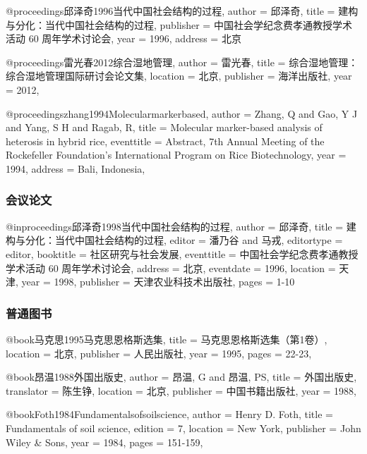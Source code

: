 \begin{latexexample}
  @proceedings{邱泽奇1996当代中国社会结构的过程,  
    author       = {邱泽奇},
    title        = {建构与分化：当代中国社会结构的过程},
    publisher    = {中国社会学纪念费孝通教授学术活动 60 周年学术讨论会},
    year         = {1996},
    address      = {北京}
  }

  @proceedings{雷光春2012综合湿地管理,
    author          = {雷光春},
    title           = {综合湿地管理：综合湿地管理国际研讨会论文集},
    location        = {北京},
    publisher       = {海洋出版社},
    year            = {2012},
  }

  @proceedings{zhang1994Molecularmarkerbased,  
    author       = {Zhang, Q and Gao, Y J and Yang, S H and Ragab, R},
    title        = {Molecular marker-based analysis of heterosis in hybrid rice},
    eventtitle   = {Abstract, 7th Annual Meeting of the Rockefeller Foundation's International Program on Rice Biotechnology},
    year         = {1994},
    address      = {Bali, Indonesia},
  }
\end{latexexample}


\subsubsection{会议论文}

\begin{latexexample}
  @inproceedings{邱泽奇1998当代中国社会结构的过程,
    author          = {邱泽奇},
    title           = {建构与分化：当代中国社会结构的过程},
    editor          = {潘乃谷 and 马戎},
    editortype      = {editor},
    booktitle       = {社区研究与社会发展},
    eventtitle      = {中国社会学纪念费孝通教授学术活动 60 周年学术讨论会},
    address         = {北京},
    eventdate       = {1996},
    location        = {天津},
    year            = {1998},
    publisher       = {天津农业科技术出版社},
    pages           = {1-10}
  }
\end{latexexample}


\subsubsection{普通图书}

\begin{latexexample}
  @book{马克思1995马克思恩格斯选集,
    title        = {马克思恩格斯选集（第1卷）},
    location     = {北京},
    publisher    = {人民出版社},
    year         = {1995},
    pages        = {22-23},
  }

  @book{昂温1988外国出版史,
    author       = {{昂温, G} and {昂温, PS}},
    title        = {外国出版史},
    translator   = {陈生铮},
    location     = {北京},
    publisher    = {中国书籍出版社},
    year         = {1988},
  }

  @book{Foth1984Fundamentalsofsoilscience,
    author       = {Henry D. Foth},
    title        = {Fundamentals of soil science},
    edition      = {7},
    location     = {New York},
    publisher    = {John Wiley & Sons},
    year         = {1984},
    pages        = {151-159},
  }
\end{latexexample}



